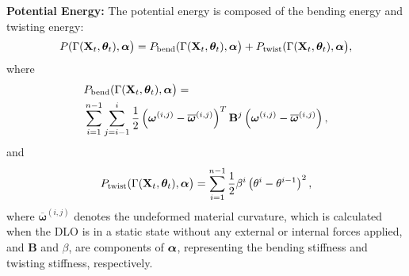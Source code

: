 \textbf{Potential Energy:}
The potential energy is composed of the bending energy and twisting energy:
\begin{equation}
  P(\Gamma(\mathbf{X}_t, \bm{\theta}_t), \bm{\alpha}\bigr) = P_\text{bend}(\Gamma(\mathbf{X}_t, \bm{\theta}_t), \bm{\alpha}\bigr) + P_\text{twist}(\Gamma(\mathbf{X}_t, \bm{\theta}_t), \bm{\alpha}\bigr),
       \label{eq:potentialP_appendix}
\end{equation}
where
\begin{align}
    \begin{split}
       & P_\text{bend}(\Gamma(\mathbf{X}_t, \bm{\theta}_t), \bm{\alpha}\bigr) =  \\
    & \sum_{i=1}^{n-1} \sum_{j=i-1}^{i} \frac{1}{2}\left( \bm{\omega}^{(i,j)} - \overline{\bm{\omega}}^{(i,j)} \right)^T \mathbf{B}^j \left( \bm{\omega}^{(i,j)} - \overline{\bm{\omega}}^{(i,j)} \right),
    \end{split}
           \label{eq:potentialPbend}
\end{align}
and
\begin{equation}
    P_\text{twist}(\Gamma(\mathbf{X}_t, \bm{\theta}_t), \bm{\alpha}\bigr) = \sum_{i=1}^{n-1} \frac{1}{2} \beta^i \left(\theta^i - \theta^{i-1} \right)^2,
   \label{eq:potentialPtwist}
\end{equation}
where \(\overline{\bm{\omega}}^{(i,j)}\) denotes the undeformed material curvature, which is calculated when the DLO is in a static state without any external or internal forces applied, and $\mathbf{B}$ and $\beta$, are components of $\bm{\alpha}$, representing the bending stiffness and twisting stiffness, respectively.


